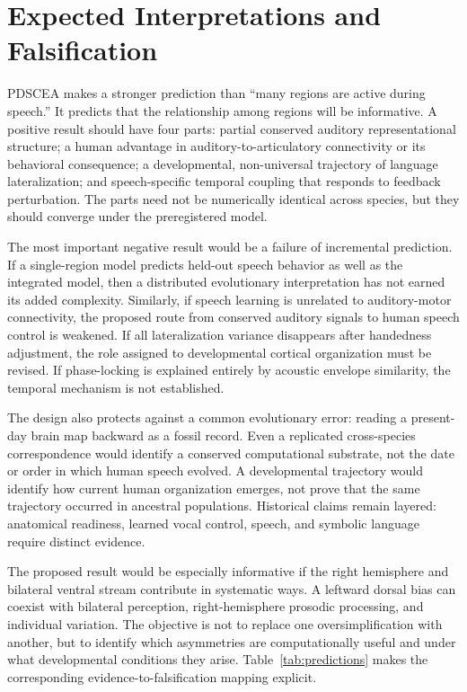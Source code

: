 \documentclass[conference]{IEEEtran}
\begin{document}
\section{Expected Interpretations and Falsification}

PDSCEA makes a stronger prediction than ``many regions are active during speech.'' It predicts that the relationship among regions will be informative. A positive result should have four parts: partial conserved auditory representational structure; a human advantage in auditory-to-articulatory connectivity or its behavioral consequence; a developmental, non-universal trajectory of language lateralization; and speech-specific temporal coupling that responds to feedback perturbation. The parts need not be numerically identical across species, but they should converge under the preregistered model.

The most important negative result would be a failure of incremental prediction. If a single-region model predicts held-out speech behavior as well as the integrated model, then a distributed evolutionary interpretation has not earned its added complexity. Similarly, if speech learning is unrelated to auditory-motor connectivity, the proposed route from conserved auditory signals to human speech control is weakened. If all lateralization variance disappears after handedness adjustment, the role assigned to developmental cortical organization must be revised. If phase-locking is explained entirely by acoustic envelope similarity, the temporal mechanism is not established.

The design also protects against a common evolutionary error: reading a present-day brain map backward as a fossil record. Even a replicated cross-species correspondence would identify a conserved computational substrate, not the date or order in which human speech evolved. A developmental trajectory would identify how current human organization emerges, not prove that the same trajectory occurred in ancestral populations. Historical claims remain layered: anatomical readiness, learned vocal control, speech, and symbolic language require distinct evidence.

The proposed result would be especially informative if the right hemisphere and bilateral ventral stream contribute in systematic ways. A leftward dorsal bias can coexist with bilateral perception, right-hemisphere prosodic processing, and individual variation. The objective is not to replace one oversimplification with another, but to identify which asymmetries are computationally useful and under what developmental conditions they arise. Table~\ref{tab:predictions} makes the corresponding evidence-to-falsification mapping explicit.
\end{document}
